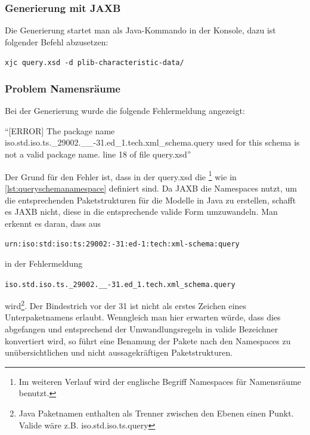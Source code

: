 \subsubsection{Generierung mit JAXB}

Die Generierung startet man als Java-Kommando in der Konsole, dazu ist folgender Befehl abzusetzen:

\lstinline[basicstyle=\ttfamily\small\mdseries]{xjc query.xsd -d plib-characteristic-data/ }

\subsubsection{Problem Namensräume}
Bei der Generierung wurde die folgende Fehlermeldung angezeigt:

\enquote{[ERROR] The package name iso.std.iso.ts.\_29002.\_\_-31.ed\_1.tech.xml\_schema.query used for this schema is not a valid package name. line 18 of file query.xsd}
  
Der Grund für den Fehler ist, dass in der query.xsd die \footnote{Im weiteren Verlauf wird der englische Begriff Namespaces für Namensräume benutzt.} wie in \autoref{lst:queryschemanamespace} definiert sind. Da JAXB die \Glspl{Namespace} nutzt, um die entsprechenden Paketstrukturen für die Modelle in Java zu erstellen, schafft es JAXB nicht, diese in die entsprechende valide Form umzuwandeln. Man erkennt es daran, dass aus 

\lstinline[basicstyle=\ttfamily\small\mdseries]{urn:iso:std:iso:ts:29002:-31:ed-1:tech:xml-schema:query }

in der Fehlermeldung 

\lstinline[basicstyle=\ttfamily\small\mdseries]{iso.std.iso.ts._29002.__-31.ed_1.tech.xml_schema.query}

wird\footnote{Java Paketnamen enthalten als Trenner zwischen den Ebenen einen Punkt. Valide wäre z.B. iso.std.iso.ts.query}.
Der Bindestrich vor der 31 ist nicht als erstes Zeichen eines Unterpaketnamens erlaubt. Wenngleich man hier erwarten würde, dass dies abgefangen und entsprechend der Umwandlungsregeln in valide Bezeichner konvertiert wird, so führt eine Benamung der Pakete nach den \Glspl{Namespace} zu unübersichtlichen und nicht aussagekräftigen Paketstrukturen. 

